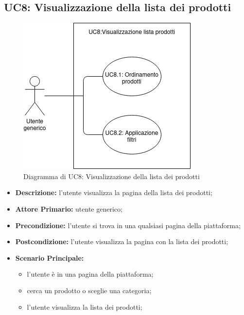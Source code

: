 \subsection{UC8: Visualizzazione della lista dei prodotti}
        \label{sec:UC8}
        \begin{figure}[!ht]
            \caption{Diagramma di UC8: Visualizzazione della lista dei prodotti}
            \vspace{10px}
            \includegraphics[scale=0.5]{../../../Images/AnalisiRequisiti/UC08.png}
            \centering
        \end{figure}
        \begin{itemize}
            \item \textbf{Descrizione:} l'utente visualizza la pagina della lista dei prodotti;
            \item \textbf{Attore Primario:} utente generico;
            \item \textbf{Precondizione:} l'utente si trova in una qualsiasi pagina della piattaforma;
            \item \textbf{Postcondizione:} l'utente visualizza la pagina con la lista dei prodotti;
            \item \textbf{Scenario Principale:}
            \begin{itemize}
                \item l'utente è in una pagina della piattaforma;
                \item cerca un prodotto o sceglie una categoria;
                \item l'utente visualizza la lista dei prodotti;
            \end{itemize}
        \end{itemize}
